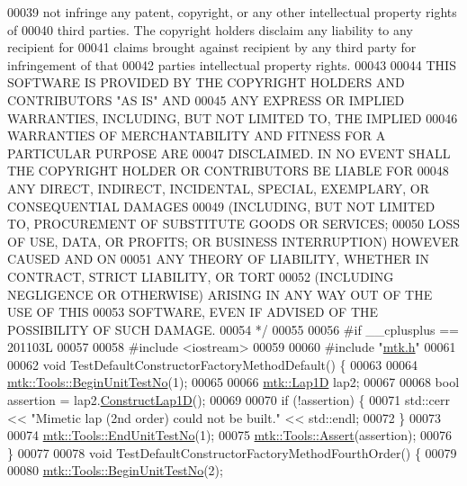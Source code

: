 \begin{DoxyCode}
00039 \textcolor{comment}{not infringe any patent, copyright, or any other intellectual property rights of}
00040 \textcolor{comment}{third parties. The copyright holders disclaim any liability to any recipient for}
00041 \textcolor{comment}{claims brought against recipient by any third party for infringement of that}
00042 \textcolor{comment}{parties intellectual property rights.}
00043 \textcolor{comment}{}
00044 \textcolor{comment}{THIS SOFTWARE IS PROVIDED BY THE COPYRIGHT HOLDERS AND CONTRIBUTORS "AS IS" AND}
00045 \textcolor{comment}{ANY EXPRESS OR IMPLIED WARRANTIES, INCLUDING, BUT NOT LIMITED TO, THE IMPLIED}
00046 \textcolor{comment}{WARRANTIES OF MERCHANTABILITY AND FITNESS FOR A PARTICULAR PURPOSE ARE}
00047 \textcolor{comment}{DISCLAIMED. IN NO EVENT SHALL THE COPYRIGHT HOLDER OR CONTRIBUTORS BE LIABLE FOR}
00048 \textcolor{comment}{ANY DIRECT, INDIRECT, INCIDENTAL, SPECIAL, EXEMPLARY, OR CONSEQUENTIAL DAMAGES}
00049 \textcolor{comment}{(INCLUDING, BUT NOT LIMITED TO, PROCUREMENT OF SUBSTITUTE GOODS OR SERVICES;}
00050 \textcolor{comment}{LOSS OF USE, DATA, OR PROFITS; OR BUSINESS INTERRUPTION) HOWEVER CAUSED AND ON}
00051 \textcolor{comment}{ANY THEORY OF LIABILITY, WHETHER IN CONTRACT, STRICT LIABILITY, OR TORT}
00052 \textcolor{comment}{(INCLUDING NEGLIGENCE OR OTHERWISE) ARISING IN ANY WAY OUT OF THE USE OF THIS}
00053 \textcolor{comment}{SOFTWARE, EVEN IF ADVISED OF THE POSSIBILITY OF SUCH DAMAGE.}
00054 \textcolor{comment}{*/}
00055 
00056 \textcolor{preprocessor}{#if \_\_cplusplus == 201103L}
00057 
00058 \textcolor{preprocessor}{#include <iostream>}
00059 
00060 \textcolor{preprocessor}{#include "\hyperlink{mtk_8h}{mtk.h}"}
00061 
00062 \textcolor{keywordtype}{void} TestDefaultConstructorFactoryMethodDefault() \{
00063 
00064   \hyperlink{classmtk_1_1Tools_a26ee906d28523378522a75e25c3a4e19}{mtk::Tools::BeginUnitTestNo}(1);
00065 
00066   \hyperlink{classmtk_1_1Lap1D}{mtk::Lap1D} lap2;
00067 
00068   \textcolor{keywordtype}{bool} assertion = lap2.\hyperlink{classmtk_1_1Lap1D_a685dcba88c08cf5b7b6c2aa4669a472c}{ConstructLap1D}();
00069 
00070   \textcolor{keywordflow}{if} (!assertion) \{
00071     std::cerr << \textcolor{stringliteral}{"Mimetic lap (2nd order) could not be built."} << std::endl;
00072   \}
00073 
00074   \hyperlink{classmtk_1_1Tools_ad8cf0085133dd40c913fe195bc5b9694}{mtk::Tools::EndUnitTestNo}(1);
00075   \hyperlink{classmtk_1_1Tools_aa311fada9255627d06c56b1e4fedce9e}{mtk::Tools::Assert}(assertion);
00076 \}
00077 
00078 \textcolor{keywordtype}{void} TestDefaultConstructorFactoryMethodFourthOrder() \{
00079 
00080   \hyperlink{classmtk_1_1Tools_a26ee906d28523378522a75e25c3a4e19}{mtk::Tools::BeginUnitTestNo}(2);

\end{DoxyCode}
